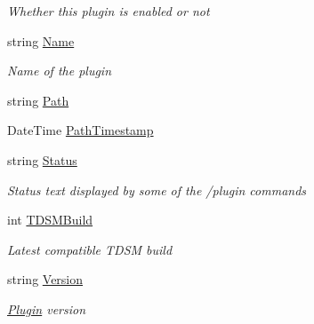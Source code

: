 \begin{DoxyCompactItemize}
\begin{DoxyCompactList}\small\item\em Whether this plugin is enabled or not \end{DoxyCompactList}\item 
string \hyperlink{classOTA_1_1Plugin_1_1BasePlugin_a7ee9065718e6628dc7791b756fa6c0f9}{Name}
\begin{DoxyCompactList}\small\item\em Name of the plugin \end{DoxyCompactList}\item 
string \hyperlink{classOTA_1_1Plugin_1_1BasePlugin_af331ba015acf9191899985a835008b9d}{Path}
\item 
Date\+Time \hyperlink{classOTA_1_1Plugin_1_1BasePlugin_aae8064b3bcbaaf579fe3aca7541a4b8f}{Path\+Timestamp}
\item 
string \hyperlink{classOTA_1_1Plugin_1_1BasePlugin_afdaa27edb811d806bc72f1d53c7334cc}{Status}
\begin{DoxyCompactList}\small\item\em Status text displayed by some of the /plugin commands \end{DoxyCompactList}\item 
int \hyperlink{classOTA_1_1Plugin_1_1BasePlugin_ad339cda6744dc995542dc552ec525a6e}{T\+D\+S\+M\+Build}
\begin{DoxyCompactList}\small\item\em Latest compatible T\+D\+S\+M build \end{DoxyCompactList}\item 
string \hyperlink{classOTA_1_1Plugin_1_1BasePlugin_a8ca1a1a001dc102637530f1a11a83224}{Version}
\begin{DoxyCompactList}\small\item\em \hyperlink{namespaceOTA_1_1Plugin}{Plugin} version \end{DoxyCompactList}\end{DoxyCompactItemize}


